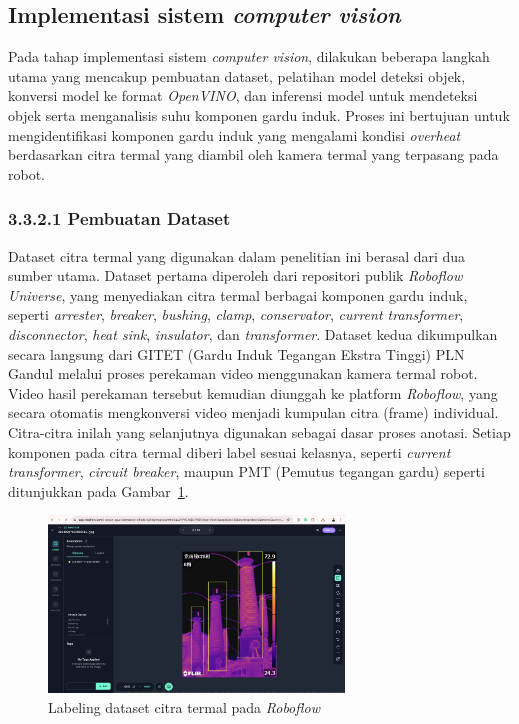 \subsection{Implementasi sistem \emph{computer vision}}
Pada tahap implementasi sistem \emph{computer vision}, dilakukan beberapa langkah utama yang mencakup pembuatan dataset, pelatihan model deteksi objek, konversi model ke format \emph{OpenVINO}, dan inferensi model untuk mendeteksi objek serta menganalisis suhu komponen gardu induk. Proses ini bertujuan untuk mengidentifikasi komponen gardu induk yang mengalami kondisi \emph{overheat} berdasarkan citra termal yang diambil oleh kamera termal yang terpasang pada robot.


\subsubsection{3.3.2.1 Pembuatan Dataset}
Dataset citra termal yang digunakan dalam penelitian ini berasal dari dua sumber utama. Dataset pertama diperoleh dari repositori publik \emph{Roboflow Universe}, yang menyediakan citra termal berbagai komponen gardu induk, seperti \emph{arrester}, \emph{breaker}, \emph{bushing}, \emph{clamp}, \emph{conservator}, \emph{current transformer}, \emph{disconnector}, \emph{heat sink}, \emph{insulator}, dan \emph{transformer}. Dataset kedua dikumpulkan secara langsung dari GITET (Gardu Induk Tegangan Ekstra Tinggi) PLN Gandul melalui proses perekaman video menggunakan kamera termal robot. Video hasil perekaman tersebut kemudian diunggah ke platform \emph{Roboflow}, yang secara otomatis mengkonversi video menjadi kumpulan citra (frame) individual. Citra-citra inilah yang selanjutnya digunakan sebagai dasar proses anotasi. Setiap komponen pada citra termal diberi label sesuai kelasnya, seperti \emph{current transformer}, \emph{circuit breaker}, maupun PMT (Pemutus tegangan gardu) seperti ditunjukkan pada Gambar~\ref{fig:dataset-annotated}. 
\begin{figure}[H]
  \centering
  \includegraphics[width=0.7\textwidth]{gambar/bab3/dataset-anotated.png}
  \caption{Labeling dataset citra termal pada \emph{Roboflow}}
  \label{fig:dataset-annotated}
  \end{figure}

